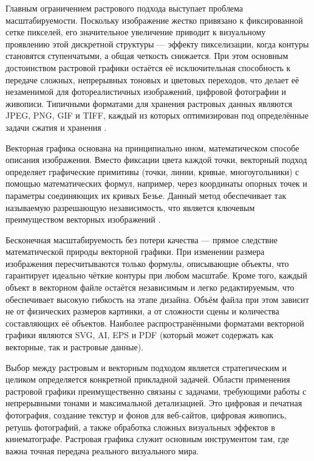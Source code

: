 \documentclass{SibFU-docs}
\begin{document}
Главным ограничением растрового подхода выступает проблема масштабируемости. Поскольку изображение жестко привязано к фиксированной сетке пикселей, его значительное увеличение приводит к визуальному проявлению этой дискретной структуры — эффекту пикселизации, когда контуры становятся ступенчатыми, а общая четкость снижается. При этом основным достоинством растровой графики остаётся её исключительная способность к передаче сложных, непрерывных тоновых и цветовых переходов, что делает её незаменимой для фотореалистичных изображений, цифровой фотографии и живописи. Типичными форматами для хранения растровых данных являются JPEG, PNG, GIF и TIFF, каждый из которых оптимизирован под определённые задачи сжатия и хранения \cite{rastr_vs_vector}.


Векторная графика основана на принципиально ином, математическом способе описания изображения. Вместо фиксации цвета каждой точки, векторный подход определяет графические примитивы (точки, линии, кривые, многоугольники) с помощью математических формул, например, через координаты опорных точек и параметры соединяющих их кривых Безье. Данный метод обеспечивает так называемую разрешающую независимость, что является ключевым преимуществом векторных изображений \cite{vektor_osnovy}.

Бесконечная масштабируемость без потери качества — прямое следствие математической природы векторной графики. При изменении размера изображения пересчитываются только формулы, описывающие объекты, что гарантирует идеально чёткие контуры при любом масштабе. Кроме того, каждый объект в векторном файле остаётся независимым и легко редактируемым, что обеспечивает высокую гибкость на этапе дизайна. Объём файла при этом зависит не от физических размеров картинки, а от сложности сцены и количества составляющих её объектов. Наиболее распространёнными форматами векторной графики являются SVG, AI, EPS и PDF (который может содержать как векторные, так и растровые данные).


Выбор между растровым и векторным подходом является стратегическим и целиком определяется конкретной прикладной задачей. Области применения растровой графики преимущественно связаны с задачами, требующими работы с непрерывными тонами и максимальной детализацией. Это цифровая и печатная фотография, создание текстур и фонов для веб-сайтов, цифровая живопись, ретушь фотографий, а также обработка сложных визуальных эффектов в кинематографе. Растровая графика служит основным инструментом там, где важна точная передача реального визуального мира.
\end{document}
